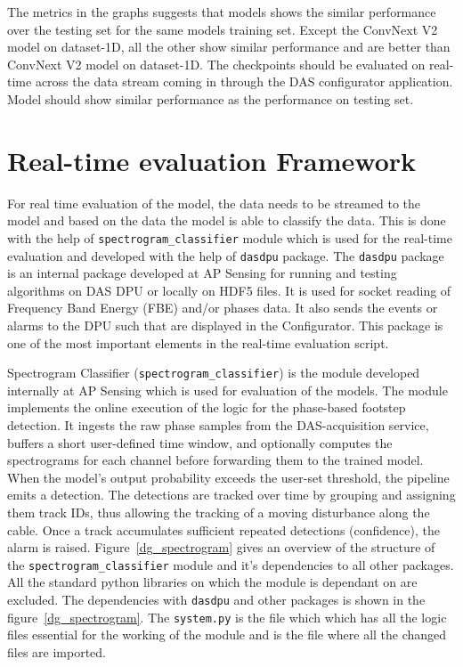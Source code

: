 The metrics in the graphs suggests that models shows the similar performance over the testing set for the same models training set. Except the ConvNext V2 model on dataset-1D, all the other show similar performance and are better than ConvNext V2 model on dataset-1D. The checkpoints should be evaluated on real-time across the data stream coming in through the DAS configurator application. Model should show similar performance as the performance on testing set. 

\section{Real-time evaluation Framework}
\label{sec:realtime_evaluation}
For real time evaluation of the model, the data needs to be streamed to the model and based on the data the model is able to classify the data. This is done with the help of \texttt{spectrogram\_classifier} module which is used for the real-time evaluation and developed with the help of \texttt{dasdpu} package. The \texttt{dasdpu} package is an internal package developed at AP Sensing for running and testing algorithms on DAS DPU or locally on HDF5 files. It is used for socket reading of Frequency Band Energy (FBE) and/or phases data. It also sends the events or alarms to the DPU such that are displayed in the Configurator. This package is one of the most important elements in the real-time evaluation script.

Spectrogram Classifier (\texttt{spectrogram\_classifier}) is the module developed internally at AP Sensing which is used for evaluation of the models. The module implements the online execution of the logic for the phase-based footstep detection. It ingests the raw phase samples from the DAS-acquisition service, buffers a short user-defined time window, and optionally computes the spectrograms for each channel before forwarding them to the trained model. When the model's output probability exceeds the user-set threshold, the pipeline emits a detection. The detections are tracked over time by grouping and assigning them track IDs, thus allowing the tracking of a moving disturbance along the cable. Once a track accumulates sufficient repeated detections (confidence), the alarm is raised. Figure~\ref{dg_spectrogram} gives an overview of the structure of the \texttt{spectrogram\_classifier} module and it's dependencies to all other packages. All the standard python libraries on which the module is dependant on are excluded. The dependencies with \texttt{dasdpu} and other packages is shown in the figure~\ref{dg_spectrogram}. The \texttt{system.py} is the file which which has all the logic files essential for the working of the module and is the file where all the changed files are imported. 


